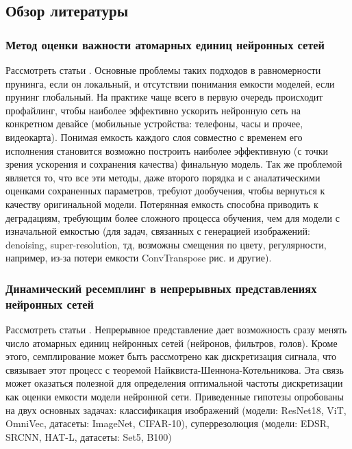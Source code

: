\subsection{Обзор литературы}

\subsubsection{Метод оценки важности атомарных единиц нейронных сетей}
\par
Рассмотреть статьи \cite{yu2021hessianaware} \cite{zhu2017prune} \cite{chen2023going} \cite{frantar2023optimal} \cite{dong2017learning}.
Основные проблемы таких подходов в равномерности прунинга, если он локальный, и отсутствии понимания емкости моделей, если прунинг глобальный. На практике чаще всего в первую очередь происходит профайлинг, чтобы наиболее эффективно ускорить нейронную сеть на конкретном девайсе (мобильные устройства: телефоны, часы и прочее, видеокарта). Понимая емкость каждого слоя совместно с временем его исполнения становится возможно построить наиболее эффективную (с точки зрения ускорения и сохранения качества) финальную модель. Так же проблемой является то, что все эти методы, даже второго порядка и с аналатическими оценками сохраненных параметров, требуют дообучения, чтобы вернуться к качеству оригинальной модели. Потерянная емкость способна приводить к деградациям, требующим более сложного процесса обучения, чем для модели с изначальной емкостью (для задач, связанных с генерацией изображений: denoising, super-resolution, тд, возможны смещения по цвету, регулярности, например, из-за потери емкости ConvTranspose рис. и другие).

\subsubsection{Динамический ресемплинг в непрерывных представлениях нейронных сетей}

\par
Рассмотреть статьи \cite{rs15123144} \cite{Solodskikh_2023_CVPR}. Непрерывное представление дает возможность сразу менять число атомарных единиц нейронных сетей (нейронов, фильтров, голов). Кроме этого, семплирование может быть рассмотрено как дискретизация сигнала, что связывает этот процесс с теоремой Найквиста-Шеннона-Котельникова. Эта связь может оказаться полезной для определения оптимальной частоты дискретизации как оценки емкости модели нейронной сети. Приведенные гипотезы опробованы на двух основных задачах: классификация изображений (модели: ResNet18, ViT, OmniVec, датасеты: ImageNet, CIFAR-10), суперрезолюция (модели: EDSR, SRCNN, HAT-L, датасеты: Set5, B100)